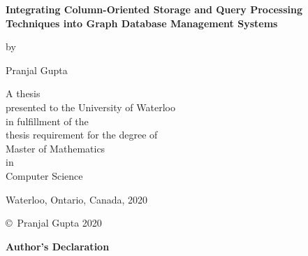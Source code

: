 
\pagestyle{empty}

\begin{titlepage}
        \begin{center}
        \vspace*{0.2cm}

        \Huge
        {\bf Integrating Column-Oriented Storage and Query
        	Processing Techniques into Graph Database
        	Management Systems }

        \vspace*{1.0cm}

        \normalsize
        by \\

        \vspace*{1.0cm}

        \Large
        Pranjal Gupta \\

        \vspace*{3.0cm}

        \normalsize
        A thesis \\
        presented to the University of Waterloo \\ 
        in fulfillment of the \\
        thesis requirement for the degree of \\
        Master of Mathematics \\
        in \\
        Computer Science \\

        \vspace*{2.0cm}

        Waterloo, Ontario, Canada, 2020 \\

        \vspace*{1.0cm}

        \copyright\ Pranjal Gupta 2020 \\
        \end{center}
\end{titlepage}

\pagestyle{plain}
\setcounter{page}{2}

\cleardoublepage

\cleardoublepage


\begin{center}\textbf{Author's Declaration}\end{center}

